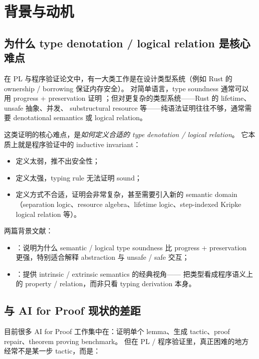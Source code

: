 \section{背景与动机}
\label{sec:background}

\subsection{为什么 type denotation / logical relation 是核心难点}

在 PL 与程序验证论文中，有一大类工作是在设计类型系统（例如 Rust 的 ownership / borrowing 保证内存安全）。
对简单语言，type soundness 通常可以用 progress + preservation 证明
\citep{WrightFelleisen1994}；但对更复杂的类型系统——Rust 的 lifetime、unsafe 抽象、并发、
substructural resource 等——纯语法证明往往不够，通常需要 denotational semantics 或 logical relation。

这类证明的核心难点，是\emph{如何定义合适的 type denotation / logical relation}。
它本质上就是程序验证中的 inductive invariant：
\begin{itemize}
  \item 定义太弱，推不出安全性；
  \item 定义太强，typing rule 无法证明 sound；
  \item 定义方式不合适，证明会非常复杂，甚至需要引入新的 semantic domain
        （separation logic、resource algebra、lifetime logic、step-indexed Kripke logical relation 等）。
\end{itemize}

两篇背景文献：
\begin{itemize}
  \item \citet{Timany2024JACM}：说明为什么 semantic / logical type soundness 比 progress + preservation
        更强，特别适合解释 abstraction 与 unsafe / safe 交互；
  \item \citet{Reynolds2000Meaning}：提供 intrinsic / extrinsic semantics 的经典视角——
        把类型看成程序语义上的 property / relation，而非只看 typing derivation 本身。
\end{itemize}

\subsection{与 AI for Proof 现状的差距}

目前很多 AI for Proof 工作集中在：证明单个 lemma、生成 tactic、proof repair、theorem proving benchmark。
但在 PL / 程序验证里，真正困难的地方经常不是某一步 tactic，而是：

